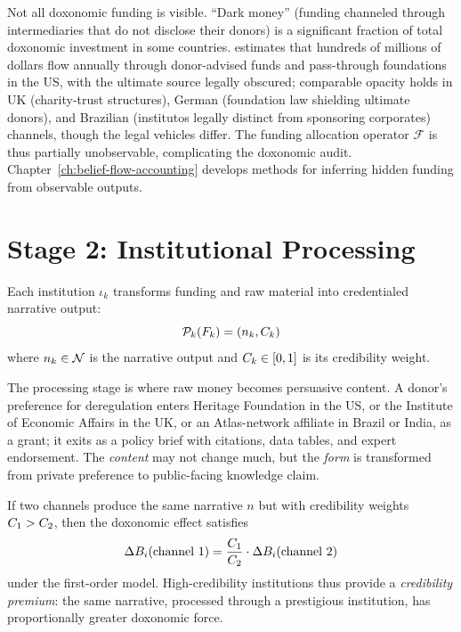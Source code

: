 \begin{remark}
\label{rem:dark-budget}
Not all doxonomic funding is visible.
``Dark money'' (funding channeled through intermediaries that do not disclose their donors) is a significant fraction of total doxonomic investment in some countries.
\textcite{mayer2016} estimates that hundreds of millions of dollars flow annually through donor-advised funds and pass-through foundations in the US, with the ultimate source legally obscured; comparable opacity holds in UK (charity-trust structures), German (foundation law shielding ultimate donors), and Brazilian (institutos legally distinct from sponsoring corporates) channels, though the legal vehicles differ.
The funding allocation operator $\mathcal{F}$ is thus partially unobservable, complicating the doxonomic audit.
Chapter~\ref{ch:belief-flow-accounting} develops methods for inferring hidden funding from observable outputs.
\end{remark}


\section{Stage 2: Institutional Processing}
\label{sec:ch5-processing}

Each institution $\iota_k$ transforms funding and raw material into credentialed narrative output:
\[
  \mathcal{P}_k(F_{k}) = (n_k, C_{k})
\]
where $n_k \in \mathcal{N}$ is the narrative output and $C_{k} \in [0,1]$ is its credibility weight.

The processing stage is where raw money becomes persuasive content.
A donor's preference for deregulation enters Heritage Foundation in the US, or the Institute of Economic Affairs in the UK, or an Atlas-network affiliate in Brazil or India, as a grant; it exits as a policy brief with citations, data tables, and expert endorsement.
The \emph{content} may not change much, but the \emph{form} is transformed from private preference to public-facing knowledge claim.

\begin{proposition}
\label{prop:credibility-premium}
If two channels produce the same narrative $n$ but with credibility weights $C_{1} > C_{2}$, then the doxonomic effect satisfies
\[
  \Delta B_{i}(\text{channel } 1) = \frac{C_{1}}{C_{2}} \cdot \Delta B_{i}(\text{channel } 2)
\]
under the first-order model.
High-credibility institutions thus provide a \emph{credibility premium}: the same narrative, processed through a prestigious institution, has proportionally greater doxonomic force.
\end{proposition}

